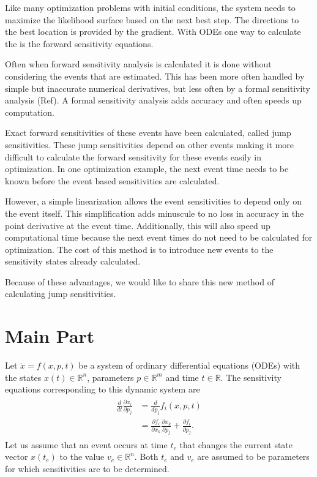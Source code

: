 \documentclass[journal, a4paper]{IEEEtran}
\begin{document}
	Like many optimization problems with initial conditions, the system needs 
	to maximize the likelihood surface based on the next best step.  
	The directions to the best location is provided by the gradient.  
	With ODEs one way to calculate the is the forward sensitivity equations.
	
	Often when forward sensitivity analysis is calculated it is done without
	considering the events that are estimated.  This has been more often  handled by
	simple but inaccurate numerical derivatives, but less often by a formal
	sensitivity analysis (Ref).  A formal sensitivity analysis adds accuracy and often speeds up computation.
	
	Exact forward sensitivities of these events have been calculated, called jump sensitivities. These jump sensitivities depend on other events making it more difficult to calculate the forward sensitivity for these events easily in optimization.  In one optimization example, the next event time needs to be known before the event based sensitivities are calculated.
	
	However, a simple linearization allows the event sensitivities to depend only on the event itself.  This simplification adds minuscule to no loss in accuracy in the point derivative at the event time.  Additionally, this will also speed up computational time because the next event times do not need to be calculated for optimization.  The cost of this method is to introduce new events to the sensitivity states already calculated.
	
	Because of these advantages, we would like to share this new method of calculating jump sensitivities.
	

\section{Main Part}
\label{sec:main}
Let $\dot x = f(x, p, t)$ be a system of ordinary differential equations (ODEs) with the states $x(t) \in \mathbb R^n$, parameters $p \in \mathbb R^m$ and time $t \in \mathbb R$. The sensitivity equations corresponding to this dynamic system are
\begin{align}
\begin{aligned}
    \frac{d}{dt}\frac{\partial x_i}{\partial p_j} &= \frac{d}{dp_j} f_i(x, p, t)\\
        & = \frac{\partial f_i}{\partial x_k}\frac{\partial x_k}{\partial p_j} + 
            \frac{\partial f_i}{\partial p_j}.
\end{aligned}
 \label{eq:sens}
\end{align}
Let us assume that an event occurs at time $t_e$ that changes the current state vector $x(t_e)$ to the value $v_e \in \mathbb R^n$. Both $t_e$ and $v_e$ are assumed to be parameters for which sensitivities are to be determined.
\end{document}
